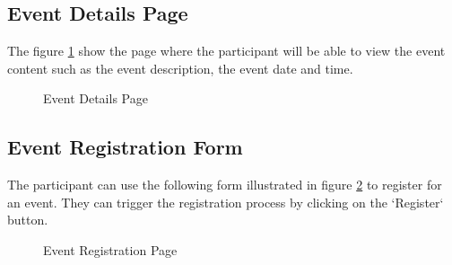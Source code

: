 \subsection{Event Details Page}
The figure \ref{fig:event_details_page} show the page where the participant will be able to view the event content
such as the event description, the event date and time.

\begin{figure}
  \centering
  \setlength\fboxsep{0pt} %
  \setlength\fboxrule{2pt} %
  \caption{Event Details Page}\label{fig:event_details_page}
\end{figure}


\subsection{Event Registration Form}
The participant can use the following form illustrated in figure \ref{fig:event_registration_page} to register for an event. They can trigger
the registration process by clicking on the `Register` button.

\begin{figure}
  \centering
  \setlength\fboxsep{0pt} %
  \setlength\fboxrule{2pt} %
  \caption{Event Registration Page}\label{fig:event_registration_page}
\end{figure}



